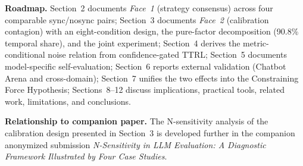 \documentclass[11pt]{article}
\begin{document}
\noindent\textbf{Roadmap.} Section~2 documents \textit{Face~1} (strategy consensus) across four comparable sync/nosync pairs; Section~3 documents \textit{Face~2} (calibration contagion) with an eight-condition design, the pure-factor decomposition (90.8\% temporal share), and the joint experiment; Section~4 derives the metric-conditional noise relation from confidence-gated TTRL; Section~5 documents model-specific self-evaluation; Section~6 reports external validation (Chatbot Arena and cross-domain); Section~7 unifies the two effects into the Constraining Force Hypothesis; Sections~8--12 discuss implications, practical tools, related work, limitations, and conclusions.

\noindent\textbf{Relationship to companion paper.} The N-sensitivity analysis of the calibration design presented in Section~3 is developed further in the companion anonymized submission \emph{N-Sensitivity in LLM Evaluation: A Diagnostic Framework Illustrated by Four Case Studies}.
\end{document}
